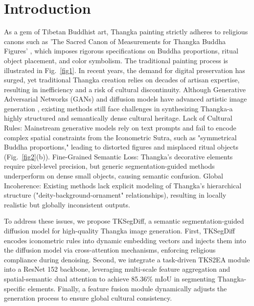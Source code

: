 \documentclass[sn-mathphys]{sn-jnl}%
\theoremstyle{thmstyleone}%
\theoremstyle{thmstyletwo}%
\theoremstyle{thmstylethree}%
\begin{document}



\maketitle

\section{Introduction}
As a gem of Tibetan Buddhist art, Thangka \cite{b1} painting strictly adheres to religious canons such as 'The Sacred Canon of Measurements for Thangka Buddha Figures' \cite{b2}, which imposes rigorous specifications on Buddha proportions, ritual object placement, and color symbolism. The traditional painting process is illustrated in Fig.~\ref{fig1}. In recent years, the demand for digital preservation \cite{b3,b4,b5} has surged, yet traditional Thangka creation relies on decades of artisan expertise, resulting in inefficiency and a risk of cultural discontinuity. Although Generative Adversarial Networks (GANs) \cite{b6} and diffusion models \cite{b7} have advanced artistic image generation \cite{b8,b9}, existing methods still face challenges in synthesizing Thangka-a highly structured and semantically dense cultural heritage. Lack of Cultural Rules: Mainstream generative models rely on text prompts and fail to encode complex spatial constraints from the Iconometric Sutra, such as "symmetrical Buddha proportions," leading to distorted figures and misplaced ritual objects (Fig.~\ref{fig2}(b)). Fine-Grained Semantic Loss: Thangka’s decorative elements require pixel-level precision, but generic segmentation-guided methods \cite{b10,b11} underperform on dense small objects, causing semantic confusion. Global Incoherence: Existing methods lack explicit modeling of Thangka’s hierarchical structure ("deity-background-ornament" relationships), resulting in locally realistic but globally inconsistent outputs.

To address these issues, we propose TKSegDiff, a semantic segmentation-guided diffusion model for high-quality Thangka image generation. First, TKSegDiff encodes iconometric rules into dynamic embedding vectors and injects them into the diffusion model via cross-attention mechanisms, enforcing religious compliance during denoising. Second, we integrate a task-driven TKS2EA module into a ResNet 152 \cite{b12} backbone, leveraging multi-scale feature aggregation and spatial-semantic dual attention to achieve 85.36\% mIoU in segmenting Thangka-specific elements. Finally, a feature fusion module dynamically adjusts the generation process to ensure global cultural consistency.
\end{document}
